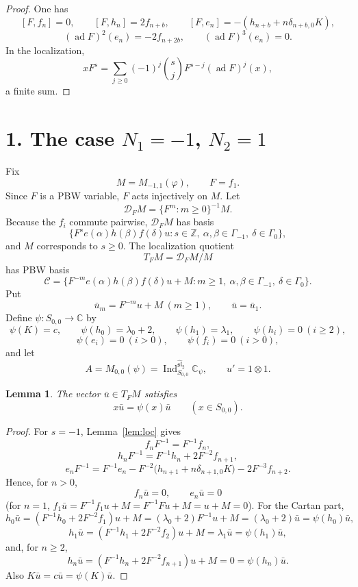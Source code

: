 \documentclass[11pt]{article}
\newcommand{\C}{\mathbb C}
\newcommand{\Z}{\mathbb Z}
\newcommand{\G}{\Gamma}
\newcommand{\slh}{\widehat{\mathfrak{sl}}_2}
\newcommand{\D}{\mathcal D}
\newcommand{\Ind}{\operatorname{Ind}}
\newcommand{\ad}{\operatorname{ad}}
\theoremstyle{plain}
\newtheorem{lemma}{Lemma}
\theoremstyle{remark}
\begin{document}
\begin{proof}
One has
\[
  [F,f_n]=0,\qquad
  [F,h_n]=2f_{n+b},\qquad
  [F,e_n]=-(h_{n+b}+n\delta_{n+b,0}K),
\]
\[
  (\ad F)^2(e_n)=-2f_{n+2b},\qquad
  (\ad F)^3(e_n)=0.
\]
In the localization,
\[
  xF^s=\sum_{j\ge0}(-1)^j\binom{s}{j}F^{s-j}(\ad F)^j(x),
\]
a finite sum.
\end{proof}

\section*{1. The case \(N_1=-1\), \(N_2=1\)}

Fix
\[
  M=M_{-1,1}(\varphi),\qquad F=f_1.
\]
Since \(F\) is a PBW variable, \(F\) acts injectively on \(M\). Let
\[
  \D_FM=\{F^m:m\ge0\}^{-1}M.
\]
Because the \(f_i\) commute pairwise, \(\D_FM\) has basis
\[
  \{F^s e(\alpha)h(\beta)f(\delta)u:
  s\in\Z,\ \alpha,\beta\in\G_{-1},\ \delta\in\G_0\},
\]
and \(M\) corresponds to \(s\ge0\). The localization quotient
\[
  T_FM=\D_FM/M
\]
has PBW basis
\[
  \mathcal C
  =
  \{F^{-m}e(\alpha)h(\beta)f(\delta)u+M:
  m\ge1,\ \alpha,\beta\in\G_{-1},\ \delta\in\G_0\}.
\]
Put
\[
  \bar u_m=F^{-m}u+M\ (m\ge1),\qquad
  \bar u=\bar u_1.
\]
Define \(\psi:S_{0,0}\to\C\) by
\[
  \psi(K)=c,\qquad
  \psi(h_0)=\lambda_0+2,\qquad
  \psi(h_1)=\lambda_1,\qquad
  \psi(h_i)=0\ (i\ge2),
\]
\[
  \psi(e_i)=0\ (i>0),\qquad
  \psi(f_i)=0\ (i>0),
\]
and let
\[
  A=M_{0,0}(\psi)=\Ind_{S_{0,0}}^{\slh}\C_\psi,
  \qquad
  u'=1\otimes1.
\]

\begin{lemma}\label{lem:cyc}
The vector \(\bar u\in T_FM\) satisfies
\[
  x\bar u=\psi(x)\bar u\qquad(x\in S_{0,0}).
\]
\end{lemma}

\begin{proof}
For \(s=-1\), Lemma~\ref{lem:loc} gives
\[
  f_nF^{-1}=F^{-1}f_n,
\]
\[
  h_nF^{-1}=F^{-1}h_n+2F^{-2}f_{n+1},
\]
\[
  e_nF^{-1}
  =
  F^{-1}e_n
  -F^{-2}\bigl(h_{n+1}+n\delta_{n+1,0}K\bigr)
  -2F^{-3}f_{n+2}.
\]
Hence, for \(n>0\),
\[
  f_n\bar u=0,\qquad e_n\bar u=0
\]
(for \(n=1\), \(f_1\bar u=F^{-1}f_1u+M=F^{-1}Fu+M=u+M=0\)). For the
Cartan part,
\[
  h_0\bar u=(F^{-1}h_0+2F^{-2}f_1)u+M
  =(\lambda_0+2)F^{-1}u+M
  =(\lambda_0+2)\bar u
  =\psi(h_0)\bar u,
\]
\[
  h_1\bar u=(F^{-1}h_1+2F^{-2}f_2)u+M=\lambda_1\bar u=\psi(h_1)\bar u,
\]
and, for \(n\ge2\),
\[
  h_n\bar u=(F^{-1}h_n+2F^{-2}f_{n+1})u+M=0=\psi(h_n)\bar u.
\]
Also \(K\bar u=c\bar u=\psi(K)\bar u\).
\end{proof}
\end{document}
